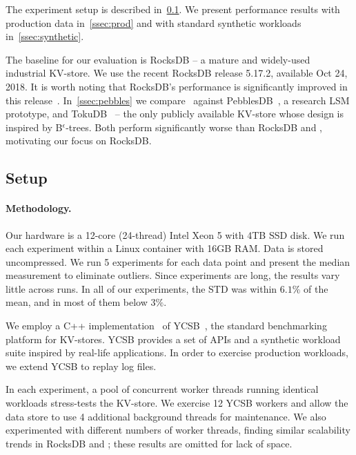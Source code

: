 
The experiment setup is described in~\cref{ssec:setup}. 
We present performance results with production data in~\cref{ssec:prod} and with standard synthetic workloads in~\cref{ssec:synthetic}. 

The baseline for our evaluation is RocksDB -- a mature and widely-used industrial KV-store. 
We use the recent RocksDB release 5.17.2, available Oct 24, 2018.  It is worth noting that RocksDB's performance 
is significantly improved  in this release~\cite{CallaghanCompaction}.   
In~\cref{ssec:pebbles} we compare \sys\ against PebblesDB~\cite{PebblesDB}, a research LSM prototype, and TokuDB~\cite{TokuDB} 
-- the only publicly available KV-store whose design is inspired by B$^\epsilon$-trees. Both  perform significantly worse than RocksDB and \sys, 
motivating our focus on RocksDB.


 
\subsection{Setup}
\label{ssec:setup} 

\paragraph{Methodology.} 
Our hardware is a 12-core (24-thread) Intel Xeon 5  with 4TB SSD disk.  
We run each experiment within a Linux container with 16GB RAM. 
Data is stored uncompressed.
We run 5 experiments for each data point and present the median measurement to eliminate outliers. Since experiments are long, the results vary 
little across runs. In all of our experiments, the STD was within $6.1\%$ of the mean, and in most of them below $3\%$. 

We employ a C++ implementation~\cite{Cpp-YCSB} of YCSB~\cite{YCSB}, the  standard  
benchmarking platform for KV-stores. YCSB provides a set of APIs and a synthetic workload suite inspired 
by real-life applications. In order to exercise production workloads, we extend YCSB to replay log files.
 
In each experiment, a pool of concurrent worker threads running identical
workloads stress-tests the KV-store. We exercise 12 YCSB workers 
and allow the data store to use 4 additional background threads for maintenance.
We also experimented with different numbers of worker threads, finding similar scalability trends in RocksDB and 
\sys; these results are omitted for lack of space.


